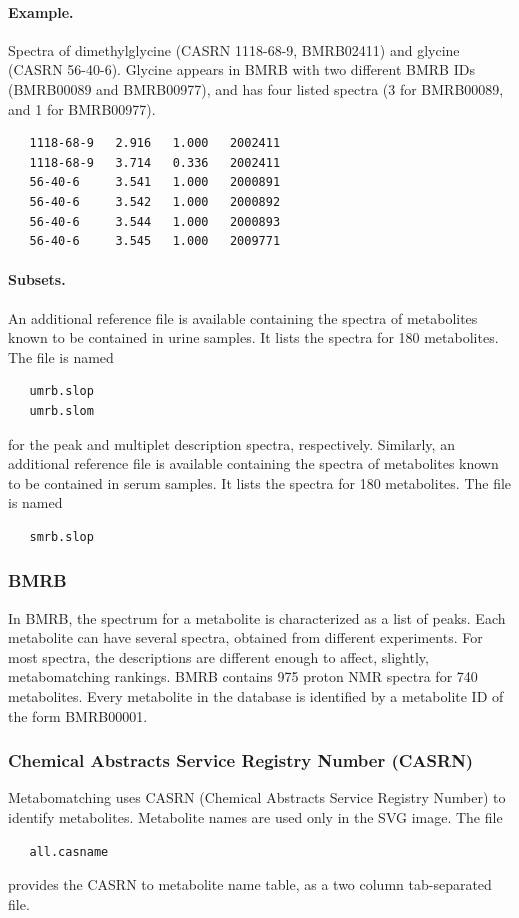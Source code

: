 \documentclass[a4paper,11pt]{article}
\begin{document}
\paragraph{Example.} Spectra of dimethylglycine (CASRN 1118-68-9, BMRB02411) and glycine (CASRN 56-40-6). Glycine appears in BMRB with two different BMRB IDs (BMRB00089 and BMRB00977), and has four listed spectra (3 for BMRB00089, and 1 for BMRB00977).
\begin{verbatim}
   1118-68-9   2.916   1.000   2002411
   1118-68-9   3.714   0.336   2002411
   56-40-6     3.541   1.000   2000891
   56-40-6     3.542   1.000   2000892   
   56-40-6     3.544   1.000   2000893
   56-40-6     3.545   1.000   2009771
\end{verbatim}
\paragraph{Subsets.} An additional reference file is available containing the spectra of metabolites known to be contained in urine samples. It lists the spectra for 180 metabolites. The file is named
\begin{verbatim}
   umrb.slop
   umrb.slom
\end{verbatim}
for the peak and multiplet description spectra, respectively. Similarly, an additional reference file is available containing the spectra of metabolites known to be contained in serum samples. It lists the spectra for 180 metabolites. The file is named
\begin{verbatim}
   smrb.slop
\end{verbatim}
\subsubsection{BMRB}
In BMRB, the spectrum for a metabolite is characterized as a list of peaks. Each metabolite can have several spectra, obtained from different experiments. For most spectra, the descriptions are different enough to affect, slightly, metabomatching rankings. BMRB contains 975 proton NMR spectra for 740 metabolites. Every metabolite in the database is identified by a metabolite ID of the form BMRB00001.
\subsubsection{Chemical Abstracts Service Registry Number (CASRN)}
Metabomatching uses CASRN (Chemical Abstracts Service Registry Number) to identify metabolites. Metabolite names are used only in the SVG image. The file
\begin{verbatim}
   all.casname
\end{verbatim}
provides the CASRN to metabolite name table, as a two column tab-separated file.
\end{document}
